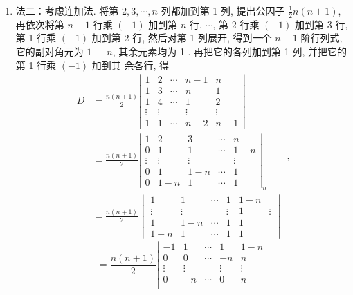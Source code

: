 \begin{enumerate}
\begin{enumerate}
\begin{enumerate}
            \item 法二：考虑连加法. 将第 $2,3, \cdots, n$ 列都加到第 1 列, 提出公因子 $\frac{1}{2} n(n+1)$, 再依次将第 $n-1$ 行乘 $(-1)$ 加到第 $n$ 行, $\cdots$, 第 2 行乘 $(-1)$ 加到第 3 行, 第 1 行乘 $(-1)$ 加到第 2 行, 然后对第 1 列展开, 得到一个 $n-1$ 阶行列式, 它的副对角元为 $1-$ $n$, 其余元素均为 1 . 再把它的各列加到第 1 列, 并把它的第 1 行乘 $(-1)$ 加到其 余各行, 得
            \[\begin{aligned}
            D &=\frac{n(n+1)}{2}\left|\begin{array}{ccccc}
            1 & 2 & \cdots & n-1 & n \\
            1 & 3 & \cdots & n & 1 \\
            1 & 4 & \cdots & 1 & 2 \\
            \vdots & \vdots & & \vdots & \vdots \\
            1 & 1 & \cdots & n-2 & n-1
            \end{array}\right| \\
            &=\frac{n(n+1)}{2}\left|\begin{array}{ccccc}
            1 & 2 & 3 & \cdots & n \\
            0 & 1 & 1 & \cdots & 1-n \\
            \vdots & \vdots & \vdots & & \vdots \\
            0 & 1 & 1-n & \cdots & 1 \\
            0 & 1-n & 1 & \cdots & 1
            \end{array}\right|_{n} \\
            &=\frac{n(n+1)}{2}
            \begin{vmatrix}
            1 & 1 & \cdots & 1 & 1-n \\
            \vdots & \vdots & & \vdots & 1 & \vdots \\
            1 & 1-n & \cdots & 1 & 1 \\
            1-n & 1 & \cdots & 1 & 1
            \end{vmatrix}
            \end{aligned},\]
            \[
            =\frac{n(n+1)}{2}\left|\begin{array}{ccccc}
            -1 & 1 & \cdots & 1 & 1-n \\
            0 & 0 & \cdots & -n & n \\
            \vdots & \vdots & & \vdots & \vdots \\
            0 & -n & \cdots & 0 & n \\

\end{array}\]
\end{enumerate}
\end{enumerate}
\end{enumerate}
